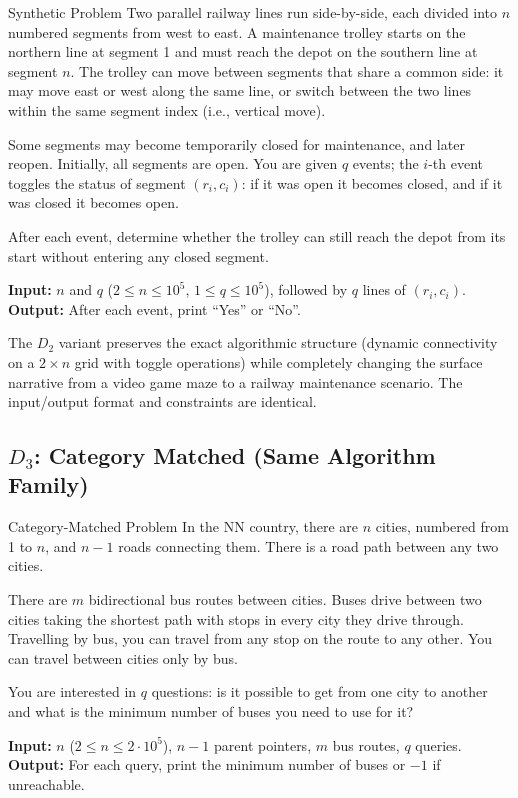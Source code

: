 \documentclass[]{bytedance_seed}
\theoremstyle{plain}
\theoremstyle{definition}
\theoremstyle{remark}
\begin{document}
\begin{problembox}{Synthetic Problem}
Two parallel railway lines run side-by-side, each divided into $n$ numbered segments from west to east. A maintenance trolley starts on the northern line at segment 1 and must reach the depot on the southern line at segment $n$. The trolley can move between segments that share a common side: it may move east or west along the same line, or switch between the two lines within the same segment index (i.e., vertical move).

Some segments may become temporarily closed for maintenance, and later reopen. Initially, all segments are open. You are given $q$ events; the $i$-th event toggles the status of segment $(r_i, c_i)$: if it was open it becomes closed, and if it was closed it becomes open.

After each event, determine whether the trolley can still reach the depot from its start without entering any closed segment.

\vspace{1.5mm}
\noindent\textbf{Input:} $n$ and $q$ ($2 \le n \le 10^5$, $1 \le q \le 10^5$), followed by $q$ lines of $(r_i, c_i)$.\\
\textbf{Output:} After each event, print ``Yes'' or ``No''.
\end{problembox}

\noindent The $D_2$ variant preserves the exact algorithmic structure (dynamic connectivity on a $2 \times n$ grid with toggle operations) while completely changing the surface narrative from a video game maze to a railway maintenance scenario. The input/output format and constraints are identical.

\subsection*{$D_3$: Category Matched (Same Algorithm Family)}

\begin{problembox}{Category-Matched Problem}
In the NN country, there are $n$ cities, numbered from 1 to $n$, and $n - 1$ roads connecting them. There is a road path between any two cities.

There are $m$ bidirectional bus routes between cities. Buses drive between two cities taking the shortest path with stops in every city they drive through. Travelling by bus, you can travel from any stop on the route to any other. You can travel between cities only by bus.

You are interested in $q$ questions: is it possible to get from one city to another and what is the minimum number of buses you need to use for it?

\vspace{1.5mm}
\noindent\textbf{Input:} $n$ ($2 \le n \le 2 \cdot 10^5$), $n-1$ parent pointers, $m$ bus routes, $q$ queries.\\
\textbf{Output:} For each query, print the minimum number of buses or $-1$ if unreachable.
\end{problembox}
\end{document}
